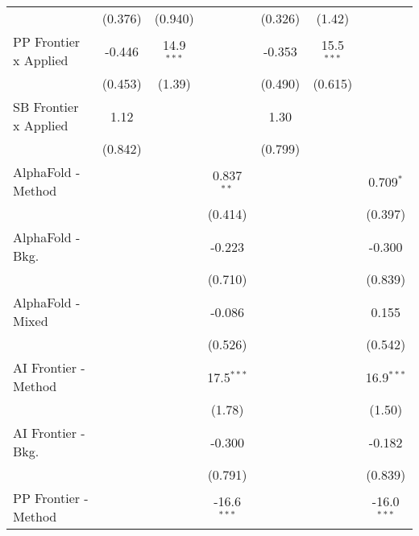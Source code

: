 \begin{tabular}{lcccccc}
                                  & (0.376)        & (0.940)        &               & (0.326)        & (1.42)        &   \\   
   PP Frontier x Applied          & -0.446         & 14.9$^{***}$   &               & -0.353         & 15.5$^{***}$  &   \\   
                                  & (0.453)        & (1.39)         &               & (0.490)        & (0.615)       &   \\   
   SB Frontier x Applied          & 1.12           &                &               & 1.30           &               &   \\   
                                  & (0.842)        &                &               & (0.799)        &               &   \\   
   AlphaFold - Method             &                &                & 0.837$^{**}$  &                &               & 0.709$^{*}$\\   
                                  &                &                & (0.414)       &                &               & (0.397)\\   
   AlphaFold - Bkg.               &                &                & -0.223        &                &               & -0.300\\   
                                  &                &                & (0.710)       &                &               & (0.839)\\   
   AlphaFold - Mixed              &                &                & -0.086        &                &               & 0.155\\   
                                  &                &                & (0.526)       &                &               & (0.542)\\   
   AI Frontier - Method           &                &                & 17.5$^{***}$  &                &               & 16.9$^{***}$\\   
                                  &                &                & (1.78)        &                &               & (1.50)\\   
   AI Frontier - Bkg.             &                &                & -0.300        &                &               & -0.182\\   
                                  &                &                & (0.791)       &                &               & (0.839)\\   
   PP Frontier - Method           &                &                & -16.6$^{***}$ &                &               & -16.0$^{***}$\\   

\end{tabular}

